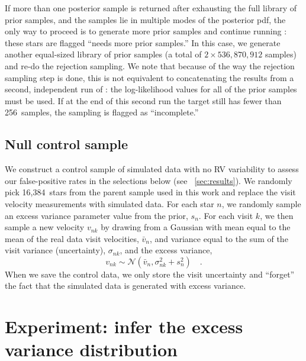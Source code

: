 \documentclass[modern, letterpaper]{aastex62}
\newcommand{\thejoker}{\project{The~Joker}}
\newcommand{\nprior}{536,870,912}
\newcommand{\nposterior}{256}
\newcommand{\ncontrol}{16,384}
\begin{document}
If more than one posterior sample is returned after exhausting the full library
of prior samples, and the samples lie in multiple modes of the posterior pdf,
the only way to proceed is to generate more prior samples and continue running
\thejoker: these stars are flagged ``needs more prior samples.''
In this case, we generate another equal-sized library of prior samples (a total
of $2\times\nprior$ samples) and re-do the rejection sampling.
We note that because of the way the rejection sampling step is done, this is not
equivalent to concatenating the results from a second, independent run of
\thejoker: the log-likelihood values for all of the prior samples must be used.
If at the end of this second run the target still has fewer than \nposterior\
samples, the sampling is flagged as ``incomplete.''

\subsection{Null control sample}
\label{sec:control-sample}

We construct a control sample of simulated data with no RV variability to assess
our false-positive rates in the selections below (see
\sectionname~\ref{sec:results}).
We randomly pick \ncontrol\ stars from the parent sample used in this work and
replace the visit velocity measurements with simulated data.
For each star $n$, we randomly sample an excess variance parameter value from
the prior, $s_n$.
For each visit $k$, we then sample a new velocity $v_{nk}$ by drawing from a
Gaussian with mean equal to the mean of the real data visit velocities,
$\bar{v}_n$, and variance equal to the sum of the visit variance (uncertainty),
$\sigma_{nk}$, and the excess variance,
\begin{equation}
    v_{nk} \sim \mathcal{N}(\bar{v}_n, \sigma_{nk}^2 + s_n^2) \quad .
\end{equation}
When we save the control data, we only store the visit uncertainty and
``forget'' the fact that the simulated data is generated with excess variance.


%


\section{Experiment: infer the excess variance distribution}
\label{sec:inferjitter}
\end{document}
